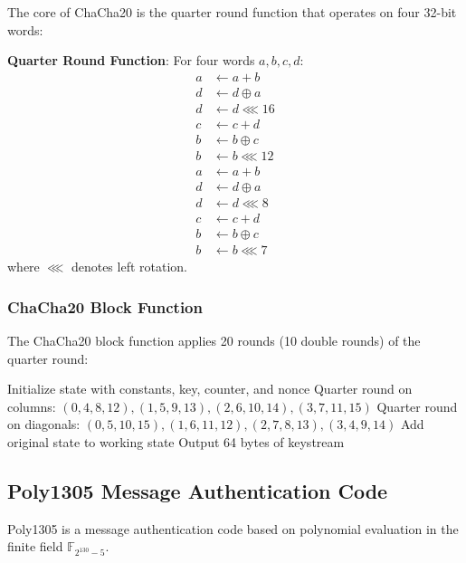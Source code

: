 \documentclass[11pt,a4paper]{article}
\begin{document}
The core of ChaCha20 is the quarter round function that operates on four 32-bit words:

\begin{mathbox}
\textbf{Quarter Round Function}: For four words $a, b, c, d$:
\begin{align*}
a &\leftarrow a + b \\
d &\leftarrow d \oplus a \\
d &\leftarrow d \lll 16 \\
c &\leftarrow c + d \\
b &\leftarrow b \oplus c \\
b &\leftarrow b \lll 12 \\
a &\leftarrow a + b \\
d &\leftarrow d \oplus a \\
d &\leftarrow d \lll 8 \\
c &\leftarrow c + d \\
b &\leftarrow b \oplus c \\
b &\leftarrow b \lll 7
\end{align*}
where $\lll$ denotes left rotation.
\end{mathbox}

\subsubsection{ChaCha20 Block Function}

The ChaCha20 block function applies 20 rounds (10 double rounds) of the quarter round:

\begin{algorithm}[H]
\caption{ChaCha20 Block Function}
\begin{algorithmic}[1]
\State Initialize state with constants, key, counter, and nonce
    \State Quarter round on columns: $(0,4,8,12), (1,5,9,13), (2,6,10,14), (3,7,11,15)$
    \State Quarter round on diagonals: $(0,5,10,15), (1,6,11,12), (2,7,8,13), (3,4,9,14)$
\EndFor
\State Add original state to working state
\State Output 64 bytes of keystream
\end{algorithmic}
\end{algorithm}

\subsection{Poly1305 Message Authentication Code}

Poly1305 is a message authentication code based on polynomial evaluation in the finite field $\mathbb{F}_{2^{130}-5}$.
\end{document}
